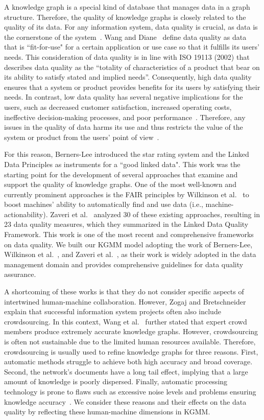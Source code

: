 \documentclass[runningheads]{llncs}
\begin{document}
A knowledge graph is a special kind of database that manages data in a graph structure. Therefore, the quality of knowledge graphs is closely related to the quality of its data. For any information system, data quality is crucial, as data is the cornerstone of the system~\cite{Larryquality}. Wang and Diane~\cite{Wang1996quality} define data quality as data that is ``fit-for-use" for a certain application or use case so that it fulfills its users' needs. This consideration of data quality is in line with ISO 19113 (2002) that describes data quality as the ``totality of characteristics of a product that bear on its ability to satisfy stated and implied needs''. Consequently, high data quality ensures that a system or product provides benefits for its users by satisfying their needs. In contrast, low data quality has several negative implications for the users, such as decreased customer satisfaction, increased operating costs, ineffective decision-making processes, and poor performance~\cite{PipinoData}. Therefore, any issues in the quality of data harms its use and thus restricts the value of the system or product from the users' point of view~\cite{zaveri2016quality}. 

For this reason, Berners-Lee introduced the star rating system and the Linked Data Principles as instruments for a ``good linked data". This work was the starting point for the development of several approaches that examine and support the quality of knowledge graphs. One of the most well-known and currently prominent approaches is the FAIR principles by Wilkinson et al.~\cite{Wilkinson2016} to boost machines' ability to automatically find and use data (i.e., machine-actionability). Zaveri et al.~\cite{zaveri2016quality} analyzed 30 of these existing approaches, resulting in 23 data quality measures, which they summarized in the Linked Data Quality Framework. This work is one of the most recent and comprehensive frameworks on data quality. We built our KGMM model adopting the work of Berners-Lee, Wilkinson et al.~\cite{Wilkinson2016}, and Zaveri et al.~\cite{zaveri2016quality}, as their work is widely adopted in the data management domain and provides comprehensive guidelines for data quality assurance.

A shortcoming of these works is that they do not consider specific aspects of intertwined human-machine collaboration. However, Zogaj and Bretschneider~\cite{zogaj_analyzing_2014} explain that successful information system projects often also include crowdsourcing. In this context, Wang et al.~\cite{wang_research_2019} further stated that expert crowd members produce extremely accurate knowledge graphs. However, crowdsourcing is often not sustainable due to the limited human resources available. Therefore, crowdsourcing is usually used to refine knowledge graphs for three reasons. First, automatic methods struggle to achieve both high accuracy and broad coverage. Second, the network's documents have a long tail effect, implying that a large amount of knowledge is poorly dispersed. Finally, automatic processing technology is prone to flaws such as excessive noise levels and problems ensuring knowledge accuracy~\cite{qi_knowledge_2021}. We consider these reasons and their effects on the data quality by reflecting these human-machine dimensions in KGMM.
\end{document}

